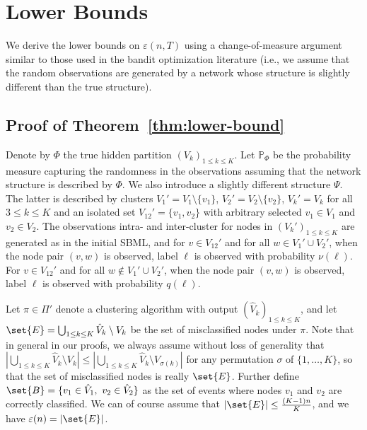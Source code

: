 
\section{Lower Bounds}

We derive the lower bounds on $\varepsilon(n,T)$ using a change-of-measure argument similar to those used in the bandit optimization literature \cite{lai1985} (i.e., we assume that the random observations are generated by a network whose structure is slightly different than the true structure). 

\subsection{Proof of Theorem~\ref{thm:lower-bound}}
  
Denote by $\Phi$ the true hidden partition $(V_k)_{1\le k \le K}$. Let
$\mathbb{P}_\Phi$ be the probability measure capturing the randomness
in the observations assuming that the network structure is described
by $\Phi$. We also introduce a slightly different structure
$\Psi$. The latter is described by clusters $V_1'=V_1 \setminus \{ v_1
\}$, $V_2'=V_2 \setminus \{ v_2 \}$, $V_k' = V_k$ for all $3 \le k \le
K$ and an isolated set $V_{12}'=\{ v_1 , v_2 \}$ with arbitrary
selected $v_1\in V_1$ and $v_2 \in V_2$. The observations intra- and
inter-cluster for nodes in $(V_k')_{1\le k \le K}$ are generated as in
the initial SBML, and for $v\in V_{12}'$ and for all $w \in V_1'\cup
V_2'$, when the node pair $(v,w)$ is observed, label $\ell$ is
observed with probability $\nu(\ell)$. For $v\in V_{12}'$ and for all
$w \notin V_1'\cup V_2'$, when the node pair $(v,w)$ is observed, label
$\ell$ is observed with probability $q(\ell)$.

Let $\pi\in \Pi'$ denote a clustering algorithm with output $(\hat{V}_k)_{1\le k \le K}$, and let $\set{E} = \bigcup_{1\le k \le K}\hat{V}_k \setminus V_k$ be the set of misclassified nodes under $\pi$. Note that in general in our proofs, we always assume without loss of generality that $| \bigcup_{1\le k \le K}\hat{V}_k \setminus V_k | \le |\bigcup_{1\le k \le K} \hat{V}_k \setminus V_{\sigma(k)}|$ for any permutation $\sigma$ of $\{1,\ldots,K\}$, so that the set of misclassified nodes is really $\set{E}$. Further define  $\set{B}=\{ v_1 \in \hat{V}_1, ~v_2 \in
\hat{V}_2\}$ as the set of events where nodes $v_1$ and $v_2$ are correctly classified. We can of course assume that $|\set{E}| \le \frac{(K-1)n}{K}$, and  we have $\varepsilon (n) = |\set{E}|$.  

